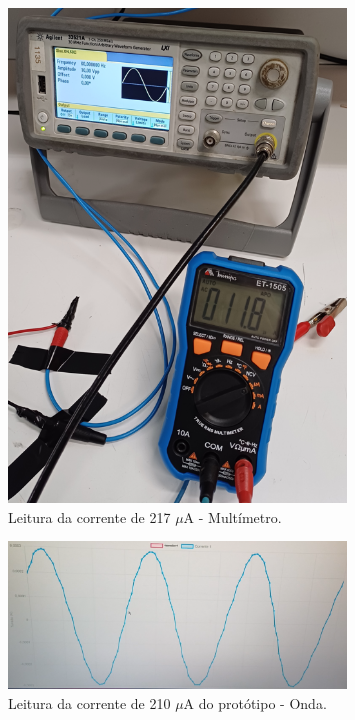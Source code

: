 \begin{figure}[htb!]
    \caption{Leitura da corrente de 217 $\mu$A - Multímetro.}
    \label{fig:leitura-micro-mult}
    \includegraphics[width=0.8\textwidth]{figuras/leitura-micro-mult.png}
    \fonte{}
\end{figure}

\begin{figure}[htb!]
    \caption{Leitura da corrente de 210 $\mu$A do protótipo - Onda.}
    \label{fig:leitura-micro-boy-onda}
    \includegraphics[width=0.8\textwidth]{figuras/leitura-micro-boy-onda.png}
    \fonte{}
\end{figure}

